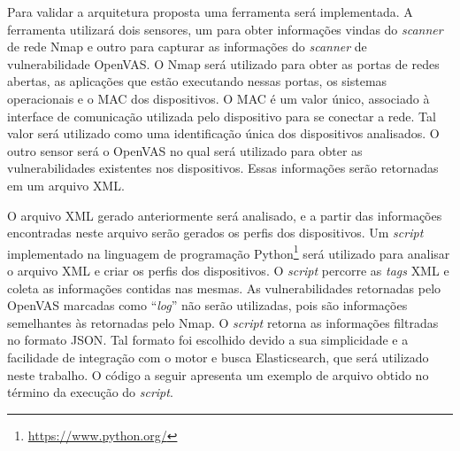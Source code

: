 Para validar a arquitetura proposta uma ferramenta será implementada. A ferramenta utilizará dois sensores, um para obter informações vindas do \textit{scanner} de rede \gls{Nmap} e outro para capturar as informações do \textit{scanner} de vulnerabilidade \gls{OpenVAS}. O \gls{Nmap} será utilizado para obter as portas de redes abertas, as aplicações que estão executando nessas portas, os sistemas operacionais e o \gls{MAC} dos dispositivos. O \gls{MAC} é um valor único, associado à interface de comunicação utilizada pelo dispositivo para se conectar a rede. Tal valor será utilizado como uma identificação única dos dispositivos analisados. O outro sensor será o \gls{OpenVAS} no qual será utilizado para obter as vulnerabilidades existentes nos dispositivos. Essas informações serão retornadas em um arquivo \gls{XML}.

O arquivo \gls{XML} gerado anteriormente será analisado, e a partir das informações encontradas neste arquivo serão gerados os perfis dos dispositivos. Um \textit{script} implementado na linguagem de programação Python\footnote{\url{https://www.python.org/}} será utilizado para analisar o arquivo \gls{XML} e criar os perfis dos dispositivos. O \textit{script} percorre as \textit{tags} \gls{XML} e coleta as informações contidas nas mesmas. As vulnerabilidades retornadas pelo \gls{OpenVAS} marcadas como ``\textit{log}'' não serão utilizadas, pois são informações semelhantes às retornadas pelo \gls{Nmap}.  O \textit{script} retorna as informações filtradas no formato \gls{JSON}. Tal formato foi escolhido devido a sua simplicidade e a facilidade de integração com o motor e busca Elasticsearch, que será utilizado neste trabalho. O código a seguir apresenta um exemplo de arquivo obtido no término da execução do \textit{script}.


